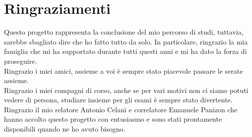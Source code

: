 \chapter*{Ringraziamenti}

Questo progetto rappresenta la conclusione del mio percorso di studi, tuttavia, sarebbe sbagliato dire che ho fatto tutto da solo. In particolare, ringrazio la mia famiglia che mi ha supportato durante tutti questi anni e mi ha dato la forza di proseguire.\\
Ringrazio i miei amici, assieme a voi è sempre stato piacevole passare le serate assieme.\\
Ringrazio i miei compagni di corso, anche se per vari motivi non ci siamo potuti vedere di persona, studiare insieme per gli esami è sempre stato divertente.\\
Ringrazio il mio relatore Antonio Celani e correlatore Emanuele Panizon che hanno accolto questo progetto con entusiasmo e sono stati prontamente disponibili quando ne ho avuto bisogno.